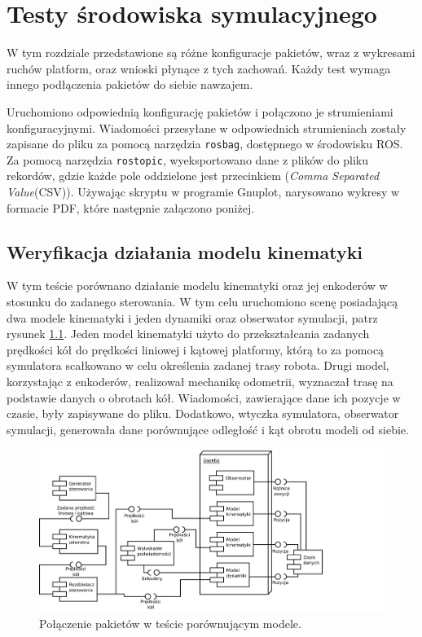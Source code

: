 \chapter{Testy środowiska symulacyjnego}
\label{sec:tests}
W tym rozdziale przedstawione są różne konfiguracje pakietów, wraz z wykresami ruchów platform, oraz wnioski płynące z tych zachowań.
Każdy test wymaga innego podłączenia pakietów do siebie nawzajem.

Uruchomiono odpowiednią konfigurację pakietów i połączono je strumieniami konfiguracyjnymi.
Wiadomości przesyłane w odpowiednich strumieniach zostały zapisane do pliku za pomocą narzędzia
\texttt{rosbag}, dostępnego w środowisku ROS.
Za pomocą narzędzia \texttt{rostopic}, wyeksportowano dane z plików do pliku rekordów, gdzie każde pole oddzielone jest przecinkiem (\emph{Comma Separated Value}(CSV)).
Używając skryptu w programie Gnuplot, narysowano wykresy w formacie PDF, które następnie załączono poniżej.

\section{Weryfikacja działania modelu kinematyki}
	W tym teście porównano działanie modelu kinematyki oraz jej enkoderów w stosunku do zadanego sterowania.
	W tym celu uruchomiono scenę posiadającą dwa modele kinematyki i jeden dynamiki oraz obserwator symulacji, patrz rysunek \ref{uml:comparison}.
	Jeden model kinematyki użyto do przekształcania zadanych prędkości kół do prędkości liniowej i kątowej platformy, którą to za pomocą symulatora scałkowano w celu określenia zadanej trasy robota. Drugi model, korzystając z enkoderów, realizował mechanikę odometrii, wyznaczał trasę na podstawie danych o obrotach kół.
	Wiadomości, zawierające dane ich pozycje w czasie, były zapisywane do pliku.
	Dodatkowo, wtyczka symulatora, obserwator symulacji, generowała dane porównujące odległość i kąt obrotu modeli od siebie.
	
	\begin{figure}[h]
		\centering
		\includegraphics[width=\textwidth]{uml/comparison.pdf}
			\caption{Połączenie pakietów w teście porównującym modele.}
		\label{uml:comparison}
	\end{figure}
	
